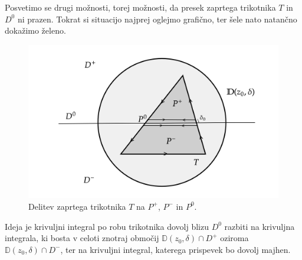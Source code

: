 \documentclass[mat1, tisk]{fmfdelo}
\begin{document}
\begin{dokaz}
        Posvetimo se drugi možnosti, torej možnosti, da presek zaprtega trikotnika $T$ in $D^0$ ni prazen. Tokrat si situacijo najprej oglejmo grafično, ter šele nato natančno dokažimo želeno.

        \begin{figure}[H]
            \begin{center}
                \includegraphics[width = 0.9 \textwidth]{schwarz_hol_2.png}
                \caption{Delitev zaprtega trikotnika $T$ na $P^+$, $P^-$ in $P^0$.}
            \end{center}    
        \end{figure}

        Ideja je krivuljni integral po robu trikotnika dovolj blizu $D^0$ razbiti na krivuljna integrala, ki bosta v celoti znotraj območij $\mathbb{D}(z_0,\delta) \cap D^+$ oziroma $\mathbb{D}(z_0,\delta) \cap D^-$, 
        ter na krivuljni integral, katerega prispevek bo dovolj majhen.
        

\end{dokaz}
\end{document}
